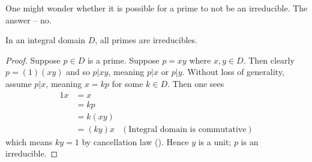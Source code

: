 One might wonder whether it is possible for a prime to not be an irreducible. The answer -- no.
\begin{theorem}\label{thrm-in-integral-domain-primes-are-irreducibles}
    In an integral domain $D$, all primes are irreducibles.
\end{theorem}
\begin{proof}
    Suppose $p \in D$ is a prime. Suppose $p = xy$ where $x, y\in D$. Then clearly $p = (1)(xy)$ and so $p \vert xy$, meaning $p \vert x$ or $p \vert y$. Without loss of generality, assume $p \vert x$, meaning $x = kp$ for some $k \in D$. Then one sees
    \begin{align*}
        1x &= x\\
        &= kp\\
        &= k(xy)\\
        &= (ky)x & (\text{Integral domain is commutative})
    \end{align*}
    which means $ky = 1$ by cancellation law (). Hence $y$ is a unit; $p$ is an irreducible.
\end{proof}

